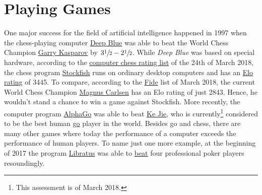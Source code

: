 \chapter{Playing Games}
One major success for the field of artificial intelligence happened in 1997 when the chess-playing computer
\href{https://en.wikipedia.org/wiki/Deep_Blue_(chess_computer)}{Deep Blue} was able to beat the World Chess
Champion \href{https://en.wikipedia.org/wiki/Garry_Kasparov}{Garry Kasparov} by $3\sfrac{1}{2}-2\sfrac{1}{2}$.
While \emph{\color{blue}Deep Blue} was based on special hardware, according to the
\href{http://www.computerchess.org.uk/ccrl/4040/rating_list_all.html}{computer chess rating list} of the 24th
of March 2018, the chess program \href{https://en.wikipedia.org/wiki/Stockfish_(chess)}{Stockfish} runs
on ordinary desktop computers and has an \href{https://en.wikipedia.org/wiki/Elo_rating_system}{Elo rating} of 3445.  
To compare, according to the
\href{https://ratings.fide.com/top.phtml?list=men}{Fide} list of March 2018, the current 
World Chess Champion \href{https://en.wikipedia.org/wiki/Magnus_Carlsen}{Magnus Carlsen} has an Elo rating of
just 2843.  Hence, he wouldn't stand a chance to win a game against Stockfish.  More recently, the computer program
\href{https://en.wikipedia.org/wiki/AlphaGo}{AlphaGo} was able to beat
\href{https://en.wikipedia.org/wiki/Ke_Jie}{Ke Jie}, who is currently\footnote{This assessment is of March 2018.} 
considered to be the best human \href{https://en.wikipedia.org/wiki/Go_(game)}{go} player in the world.
Besides go and chess, there are many other games where today the performance of a computer exceeds the performance of human players.  To name just
one more example, at the beginning of 2017 the program \href{https://en.wikipedia.org/wiki/Libratus}{Libratus} was able to 
\href{https://www.engadget.com/2017/01/31/libratus-the-poker-playing-ai-destroyed-its-four-human-rivals/}{beat}
four professional poker players resoundingly.


